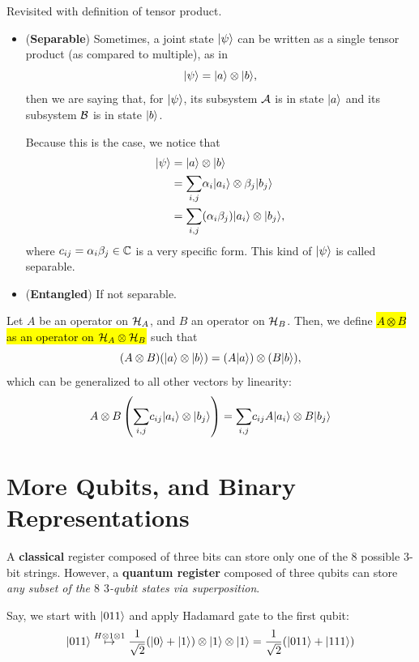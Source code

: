 \documentclass[12pt]{article}
\begin{document}
\begin{definition} Revisited with definition of tensor product.
\begin{itemize}
    \item (\textbf{Separable}) Sometimes, a joint state $\Ket{\psi}$ can be written as a single tensor product (as compared to multiple), as in $$
    \Ket{\psi} = \Ket{a}\otimes \Ket{b},
    $$ then we are saying that, for $\Ket{\psi}$, its subsystem $\AAA$ is in state $\Ket{a}$ and its subsystem $\BBB$ is in state $\Ket{b}$.

    Because this is the case, we notice that $$
    \begin{aligned}
    \Ket{\psi}
        &= \Ket{a}\otimes \Ket{b}\\
        &= \underset{i,j}{\sum}\alpha_i \Ket{a_i}\otimes \beta_j \Ket{b_j}\\
        &= \underset{i,j}{\sum}(\alpha_i\beta_j) \Ket{a_i}\otimes  \Ket{b_j},
    \end{aligned}
    $$ where $c_{ij} = \alpha_i\beta_j\in \CC$ is a very specific form. This kind of $\Ket{\psi}$ is called separable.
    \item (\textbf{Entangled}) If not separable.
\end{itemize}
\end{definition}

\begin{definition}
Let $A$ be an operator on $\HHH_A$, and $B$ an operator on $\HHH_B$. Then, we define \hl{$A\otimes B$ as an operator on $\HHH_A\otimes \HHH_B$} such that $$
(A\otimes B)(\Ket{a}\otimes \Ket{b}) = (A\Ket{a})\otimes (B\Ket{b}),
$$ which can be generalized to all other vectors by linearity: $$
A\otimes B\prt{\underset{i,j}{\sum}c_{ij}\Ket{a_i}\otimes \Ket{b_j}} = \underset{i,j}{\sum}c_{ij}A\Ket{a_i}\otimes B\Ket{b_j}
$$
\end{definition}

\section{More Qubits, and Binary Representations}
A \textbf{classical} register composed of three bits can store only one of the $8$ possible $3$-bit strings. However, a \textbf{quantum register} composed of three qubits can store \textit{any subset of the $8$ $3$-qubit states via superposition}.

\begin{example}
Say, we start with $\Ket{011}$ and apply Hadamard gate to the first qubit: $$
\Ket{011}\overset{H\otimes 1\otimes 1}{\mapsto}\frac{1}{\sqrt{2}}(\Ket{0}+\Ket{1}) \otimes \Ket{1} \otimes \Ket{1} = \frac{1}{\sqrt{2}}(\Ket{011} + \Ket{111})
$$
\end{example}
\end{document}

